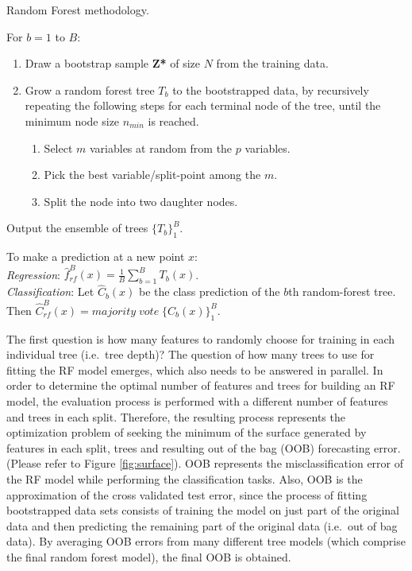 \documentclass[preprint, 3p,
authoryear]{elsarticle} %
\begin{document}
\begin{algorithm}
    \caption{Random Forest methodology.}
    \begin{algorithmic}[1]
      \item For {$b=1$ to $B$:}
        \begin{enumerate}[label=(\alph*)]
          \item Draw a bootstrap sample \textbf{Z*} of size $N$ from the training data.
          \item Grow a random forest tree $T_b$ to the bootstrapped data, by recursively repeating the following steps for each terminal node of the tree, until the minimum node size $n_{min}$ is reached.
            \begin{enumerate}[label=\roman*]
              \item Select $m$ variables at random from the $p$ variables.
              \item Pick the best variable/split-point among the $m$.
              \item Split the node into two daughter nodes.
            \end{enumerate}
       \end{enumerate}
  \item Output the ensemble of trees $\{T_b\}^B_1$.
    \end{algorithmic}
    \vspace{0.2cm}
    To make a prediction at a new point $x$:\\[0.2cm]
    \textit {Regression}: $\widehat{f}^B_{rf}(x)= \frac{1}{B} \sum_{b=1}^B T_b (x)$.\\[0.2cm]
    \textit {Classification}: Let $\widehat{C}_b(x)$ be the class prediction of the $b$th random-forest tree. \\ 
    \phantom{Classification } Then $\widehat{C}^B_{rf}(x)=majority\;vote\; \{{C}_b(x)\}^B_1$.
    \label{alg:RF}
\end{algorithm}

The first question is how many features to randomly choose for training
in each individual tree (i.e.~tree depth)? The question of how many
trees to use for fitting the RF model emerges, which also needs to be
answered in parallel. In order to determine the optimal number of
features and trees for building an RF model, the evaluation process is
performed with a different number of features and trees in each split.
Therefore, the resulting process represents the optimization problem of
seeking the minimum of the surface generated by features in each split,
trees and resulting out of the bag (OOB) forecasting error. (Please
refer to Figure \ref{fig:surface}). OOB represents the misclassification
error of the RF model while performing the classification tasks. Also,
OOB is the approximation of the cross validated test error, since the
process of fitting bootstrapped data sets consists of training the model
on just part of the original data and then predicting the remaining part
of the original data (i.e.~out of bag data). By averaging OOB errors
from many different tree models (which comprise the final random forest
model), the final OOB is obtained.
\end{document}
